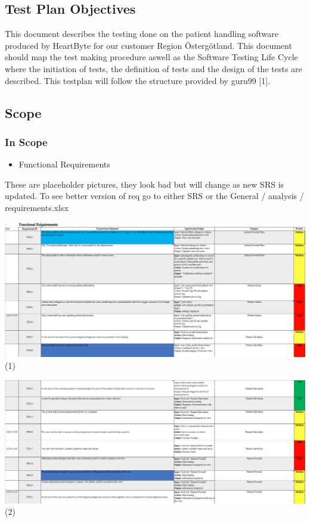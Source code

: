 
\subsection{Test Plan Objectives}
This document describes the testing done on the patient handling software produced by HeartByte for our customer Region Östergötland. This document should map the test making procedure aswell as the Software Testing Life Cycle where the initiation of tests, the definition of tests and the design of the tests are described. This testplan will follow the structure provided by guru99 [1].

\subsection{Scope}
\subsubsection{In Scope}

\begin{itemize}
  \item Functional Requirements
\end{itemize}
  These are placeholder pictures, they look bad but will change as new SRS is updated. To see better version of req go to either SRS or the General / analysis / requirements.xlsx

  \vfill
\includegraphics[width=\linewidth]{Pictures/Func1} (1)

    \vfill
    \vfill
\includegraphics[width=\linewidth]{Pictures/Func2} (2)

